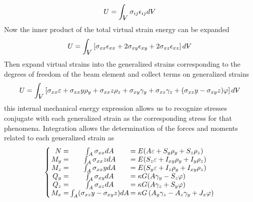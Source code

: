 \begin{equation}\label{eq:TotalVirtualStrainEnergyExpression}
U = \int_{\volume}\sigma_{ij}\epsilon_{ij}d\volume
\end{equation}
Now the inner product of the total virtual strain energy can be expanded
\begin{equation}\label{eq:TotalStrainEnergyExpanded}
U=\int_{\volume}\left[\sigma_{xx}\epsilon_{xx}+2\sigma_{xy}\epsilon_{xy}+2\sigma_{xz}\epsilon_{xz}\right]d\volume
\end{equation}
Then expand virtual strains into the generalized strains corresponding to the degrees of freedom of the beam element and collect terms on generalized strains
\begin{equation}\label{eq:TotalStrainEnergyGeneralized}
 U=\int_{\volume}\left[\sigma_{xx}\varepsilon+\sigma_{xx}y\rho_y+\sigma_{xx}z\rho_z+\sigma_{xy}\gamma_y+\sigma_{xz}\gamma_z+(\sigma_{xz}y-\sigma_{xy}z)\varphi\right]d\volume
\end{equation}
this internal mechanical energy expression allows us to recognize stresses conjugate with each generalized strain as the corresponding stress for that phenomena. Integration allows the determination of the forces and moments related to each generalized strain as
\begin{equation}\label{eq:generalizedForces}
\left\{\arraycolsep=1pt\begin{array}{rcl}
N=&\int_A\sigma_{xx}dA&=E( A\varepsilon+S_y\rho_y+S_z\rho_z)\\
M_y=&\int_A\sigma_{xx}zdA&=E(S_z\varepsilon+I_{xy}\rho_y+I_y\rho_z)\\
M_z=&\int_A\sigma_{xx}ydA&=E(S_y\varepsilon+I_z\rho_y+I_{xy}\rho_z)\\
Q_y=&\int_A\sigma_{xy}dA&=\kappa G(A\gamma_y-S_z\varphi)\\
Q_z=&\int_A\sigma_{xz}dA&=\kappa G(A\gamma_z+S_y\varphi)\\
M_x=&\int_A(\sigma_{xz}y-\sigma_{xy}z)dA&=\kappa G\left(A_y\gamma_z-A_z\gamma_y+J_x\varphi\right)
\end{array}\right.
\end{equation}
